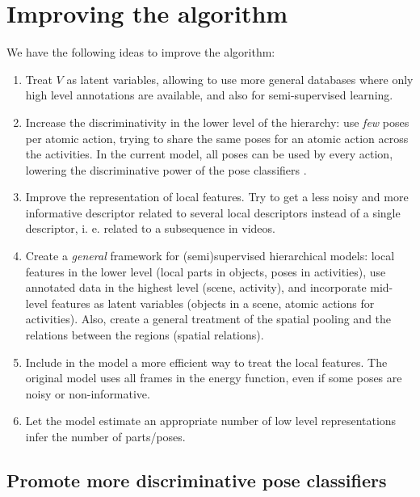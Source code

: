 \documentclass[10pt,letterpaper]{article}
\newcommand{\+}[1]{\ensuremath{{\boldsymbol #1}}}
\begin{document}
\section{Improving the algorithm}
We have the following ideas to improve the algorithm:
\begin{enumerate}
\item Treat $V$ as latent variables, allowing to use more general databases where only high level annotations are available, and also for semi-supervised learning.
\item Increase the discriminativity in the lower level of the hierarchy: use \emph{few} poses per atomic action, trying to share the same poses for an atomic action across the activities. In the current model, all poses can be used by every action, lowering the discriminative power of the pose classifiers . 
\item Improve the representation of local features. Try to get a less noisy and more informative  descriptor related to several local descriptors instead of a single descriptor, i. e. related to a subsequence in videos.
\item Create a \emph{general} framework for (semi)supervised hierarchical models: local features in the lower level (local parts in objects, poses in activities), use annotated data in the highest  level (scene, activity), and incorporate mid-level features as latent variables (objects in a scene, atomic actions for activities). Also, create a general treatment of the spatial pooling and the relations between the regions (spatial relations).
\item Include in the model a more efficient way to treat the local features. The original model uses all frames in the energy function, even if some poses are noisy or non-informative.  
\item Let the model estimate an appropriate number of low level representations  infer the number of parts/poses.
\end{enumerate}

\subsection{Promote more discriminative pose classifiers}
\end{document}
